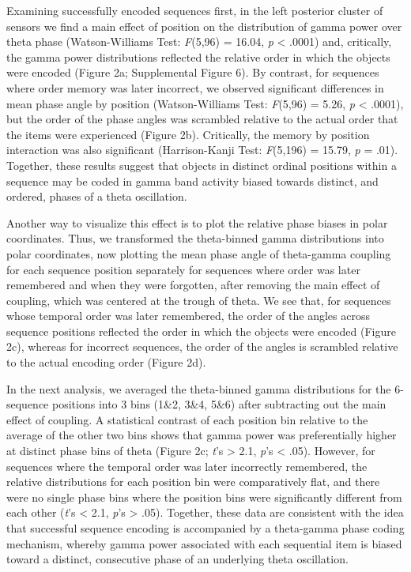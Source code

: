 Examining successfully encoded sequences first, in the left posterior
cluster of sensors we find a main effect of position on the distribution
of gamma power over theta phase (Watson-Williams Test: \emph{F}(5,96) =
16.04, \emph{p} \textless{} .0001) and, critically, the gamma power
distributions reflected the relative order in which the objects were
encoded (Figure 2a; Supplemental Figure 6). By contrast, for sequences
where order memory was later incorrect, we observed significant
differences in mean phase angle by position (Watson-Williams Test:
\emph{F}(5,96) = 5.26, \emph{p} \textless{} .0001), but the order of the
phase angles was scrambled relative to the actual order that the items
were experienced (Figure 2b). Critically, the memory by position
interaction was also significant (Harrison-Kanji Test: \emph{F}(5,196) =
15.79, \emph{p} = .01). Together, these results suggest that objects in
distinct ordinal positions within a sequence may be coded in gamma band
activity biased towards distinct, and ordered, phases of a theta
oscillation.

Another way to visualize this effect is to plot the relative phase
biases in polar coordinates. Thus, we transformed the theta-binned gamma
distributions into polar coordinates, now plotting the mean phase angle
of theta-gamma coupling for each sequence position separately for
sequences where order was later remembered and when they were forgotten,
after removing the main effect of coupling, which was centered at the
trough of theta. We see that, for sequences whose temporal order was
later remembered, the order of the angles across sequence positions
reflected the order in which the objects were encoded (Figure 2c),
whereas for incorrect sequences, the order of the angles is scrambled
relative to the actual encoding order (Figure 2d).

In the next analysis, we averaged the theta-binned gamma distributions
for the 6-sequence positions into 3 bins (1\&2, 3\&4, 5\&6) after
subtracting out the main effect of coupling. A statistical contrast of
each position bin relative to the average of the other two bins shows
that gamma power was preferentially higher at distinct phase bins of
theta (Figure 2c; \emph{t}'s \textgreater{} 2.1, \emph{p}'s \textless{}
.05). However, for sequences where the temporal order was later
incorrectly remembered, the relative distributions for each position bin
were comparatively flat, and there were no single phase bins where the
position bins were significantly different from each other (\emph{t}'s
\textless{} 2.1, \emph{p}'s \textgreater{} .05). Together, these data
are consistent with the idea that successful sequence encoding is
accompanied by a theta-gamma phase coding mechanism, whereby gamma power
associated with each sequential item is biased toward a distinct,
consecutive phase of an underlying theta oscillation.

